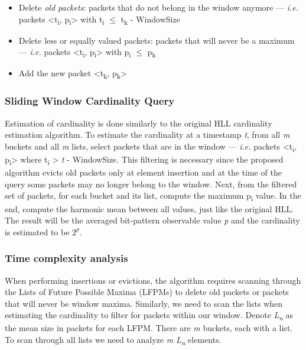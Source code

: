 \begin{itemize}
    \item Delete \textit{old packets}: packets that do not belong in the window anymore --- \textit{i.e.} packets <t\textsubscript{i}, p\textsubscript{i}> with t\textsubscript{i} $\leq$ t\textsubscript{k} - WindowSize 
    
    \item Delete less or equally valued packets: packets that will never be a maximum --- \textit{i.e.} packets <t\textsubscript{i}, p\textsubscript{i}> with p\textsubscript{i} $\leq$ p\textsubscript{k}
    
    \item Add the new packet <t\textsubscript{k}, p\textsubscript{k}>
\end{itemize}


\subsubsection*{Sliding Window Cardinality Query} 

Estimation of cardinality is done similarly to the original HLL cardinality estimation algorithm. To estimate the cardinality at a timestamp \textit{t}, from all \textit{m} buckets and all \textit{m} lists, select packets that are in the window --- \textit{i.e.} packets <t\textsubscript{i}, p\textsubscript{i}> where t\textsubscript{i} > \textit{t} - WindowSize. This filtering is necessary since the proposed algorithm evicts old packets only at element insertion and at the time of the query some packets may no longer belong to the window. Next, from the filtered set of packets, for each bucket and its list, compute the maximum p\textsubscript{i} value. In the end, compute the harmonic mean between all values, just like the original HLL. The result will be the averaged bit-pattern observable value \textit{p} and the cardinality is estimated to be $2^\textit{p}$.

\subsubsection*{Time complexity analysis}
When performing insertions or evictions, the algorithm requires scanning through the Lists of Future Possible Maxima (LFPMs) to delete old packets or packets that will never be window maxima. Similarly, we need to scan the lists when estimating the cardinality to filter for packets within our window. Denote \textit{L\textsubscript{n}} as the mean size in packets for each LFPM. There are \textit{m} buckets, each with a list. To scan through all lists we need to analyze \textit{m L\textsubscript{n}} elements. 

